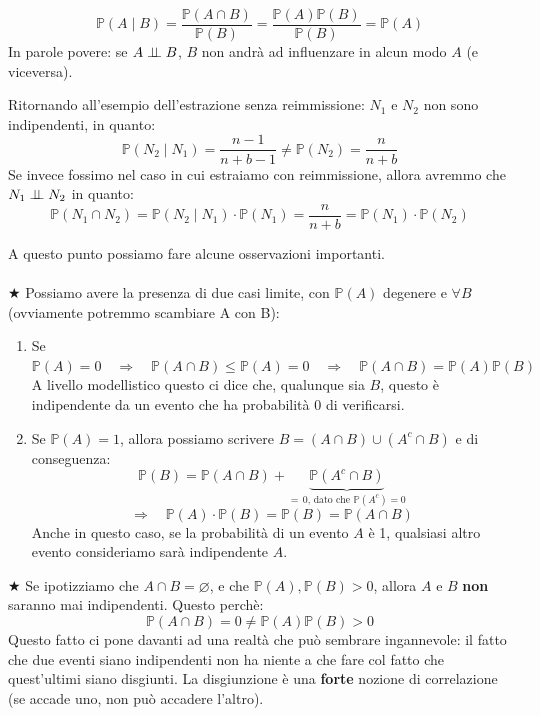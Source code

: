 \[\mathbb{P}(A\mid B) = \frac{\mathbb{P}(A\cap B)}{\mathbb{P}(B)}= \frac{\mathbb{P}(A)\mathbb{P}(B)}{\mathbb{P}(B)} = \mathbb{P}(A)\]
In parole povere: se $A \mathrel{\perp\!\!\!\perp} B$, $B$ non andrà ad influenzare in alcun modo $A$ (e viceversa).

\begin{esempio}
    Ritornando all'esempio dell'estrazione senza reimmissione: $N_1 \text{ e }N_2$ non sono indipendenti, in quanto: 
    \[\mathbb{P}(N_2\mid N_1) = \frac{n-1}{n+b-1}\neq \mathbb{P}(N_2) = \frac{n}{n+b}\]
    Se invece fossimo nel caso in cui estraiamo con reimmissione, allora avremmo che $N_1\mathrel{\perp\!\!\!\perp} N_2$ in quanto:
    \[\mathbb{P}(N_1\cap N_2)= \mathbb{P}(N_2\mid N_1)\cdot \mathbb{P}(N_1) = \frac{n}{n+b} = \mathbb{P}(N_1)\cdot\mathbb{P}(N_2)\]
\end{esempio}
\bigskip
\bigskip
\noindent A questo punto possiamo fare alcune osservazioni importanti.\\
\\
\(\bigstar\) Possiamo avere la presenza di due casi limite, con $\mathbb{P}(A)$ degenere e $\forall B$ (ovviamente potremmo scambiare A con B):
\begin{enumerate}
    \item Se $\mathbb{P}(A) = 0\quad\Rightarrow\quad \mathbb{P}(A\cap B)\leq\mathbb{P}(A) = 0 \quad\Rightarrow\quad \mathbb{P}(A\cap B) = \mathbb{P}(A)\mathbb{P}(B)$\\
    A livello modellistico questo ci dice che, qualunque sia $B$, questo è indipendente da un evento che ha probabilità $0$ di verificarsi.
    \item Se $\mathbb{P}(A) = 1$, allora possiamo scrivere $B = (A\cap B)\cup (A^c\cap B)$ e di conseguenza:
    \[\mathbb{P}(B) = \mathbb{P}(A\cap B) + \underbrace{\mathbb{P}(A^c \cap B)}_{=\,0\text{, dato che }\mathbb{P}(A^c) = 0}
    \]
    \[\Rightarrow\quad \mathbb{P}(A)\cdot\mathbb{P}(B) = \mathbb{P}(B) = \mathbb{P}(A\cap B)\]
    Anche in questo caso, se la probabilità di un evento $A$ è 1, qualsiasi altro evento consideriamo sarà indipendente $A$.
\end{enumerate}
\(\bigstar\) Se ipotizziamo che $A\cap B =\varnothing$, e che $\mathbb{P}(A), \mathbb{P}(B) > 0$, allora $A$ e $B$ \textbf{non} saranno mai indipendenti. Questo perchè:
\[\mathbb{P}(A\cap B) = 0 \neq \mathbb{P}(A)\mathbb{P}(B) > 0\]
Questo fatto ci pone davanti ad una realtà che può sembrare ingannevole: il fatto che due eventi siano indipendenti non ha niente a che fare col fatto che quest'ultimi siano disgiunti. La disgiunzione è una \textbf{forte} nozione di correlazione (se accade uno, non può accadere l'altro).\\
